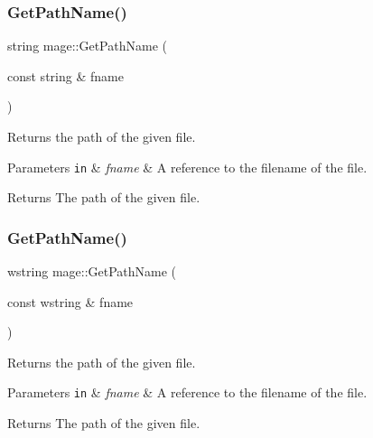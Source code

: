 \subsubsection{\texorpdfstring{Get\+Path\+Name()}{GetPathName()}\hspace{0.1cm}{\footnotesize\ttfamily [1/2]}}
{\footnotesize\ttfamily string mage\+::\+Get\+Path\+Name (\begin{DoxyParamCaption}\item[{const string \&}]{fname }\end{DoxyParamCaption})}

Returns the path of the given file.


\begin{DoxyParams}[1]{Parameters}
\mbox{\tt in}  & {\em fname} & A reference to the filename of the file. \\
\hline
\end{DoxyParams}
\begin{DoxyReturn}{Returns}
The path of the given file. 
\end{DoxyReturn}
\hypertarget{namespacemage_a171139f90ae3facdae52a61d5d73ddfa}{}\label{namespacemage_a171139f90ae3facdae52a61d5d73ddfa} 
\subsubsection{\texorpdfstring{Get\+Path\+Name()}{GetPathName()}\hspace{0.1cm}{\footnotesize\ttfamily [2/2]}}
{\footnotesize\ttfamily wstring mage\+::\+Get\+Path\+Name (\begin{DoxyParamCaption}\item[{const wstring \&}]{fname }\end{DoxyParamCaption})}

Returns the path of the given file.


\begin{DoxyParams}[1]{Parameters}
\mbox{\tt in}  & {\em fname} & A reference to the filename of the file. \\
\hline
\end{DoxyParams}
\begin{DoxyReturn}{Returns}
The path of the given file. 
\end{DoxyReturn}
\hypertarget{namespacemage_a7b67bb6f38f3e787fb3561d236b88bd2}{}\label{namespacemage_a7b67bb6f38f3e787fb3561d236b88bd2} 

